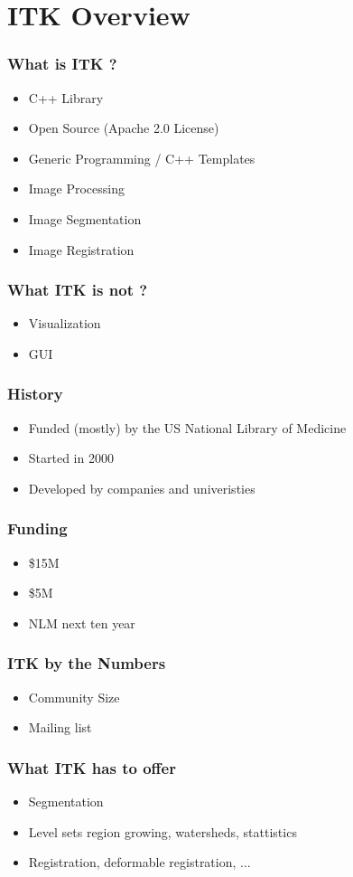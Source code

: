 \section{ITK Overview}



\begin{frame}
\frametitle{What is ITK ?}
\begin{itemize}
\item C++ Library
\pause
\item Open Source (Apache 2.0 License)
\pause
\item Generic Programming / C++ Templates
\pause
\item Image Processing
\pause
\item Image Segmentation
\pause
\item Image Registration
\end{itemize}
\end{frame}


\begin{frame}
\frametitle{What ITK is not ?}
\begin{itemize}
\item Visualization
\pause
\item GUI
\end{itemize}
\end{frame}


\begin{frame}
\frametitle{History}
\begin{itemize}
\item Funded (mostly) by the US National Library of Medicine
\pause
\item Started in 2000
\pause
\item Developed by companies and univeristies
\end{itemize}
\end{frame}


\begin{frame}
\frametitle{Funding}
\begin{itemize}
\item \$15M
\pause
\item \$5M
\pause
\item NLM next ten year
\end{itemize}
\end{frame}


\begin{frame}
\frametitle{ITK by the Numbers}
\begin{itemize}
\item Community Size
\pause
\item Mailing list
\end{itemize}
\end{frame}


\begin{frame}
\frametitle{What ITK has to offer}
\begin{itemize}
\item Segmentation
\pause
\item Level sets region growing, watersheds, stattistics
\pause
\item Registration, deformable registration, ...
\end{itemize}
\end{frame}

